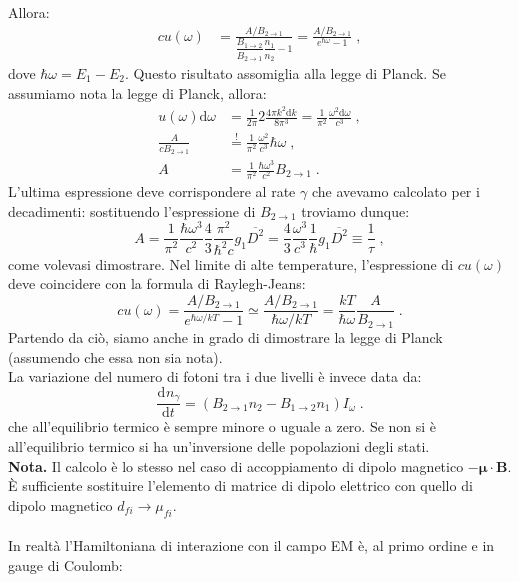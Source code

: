 \documentclass[12pt,a4paper]{report}
\theoremstyle{definition}
\newcommand{\dev}[3][]{\frac{\mathrm{d}^{#1} #2}{\mathrm{d} #3^{#1}}}
\numberwithin{equation}{section}
\newcommand{\diff}[1][]{\mathrm{d}#1}
\begin{document}
Allora:
\begin{align}
cu(\omega) &= \frac{A/B_{2\to 1}}{\dfrac{B_{1\to 2}}{B_{2\to 1}}\dfrac{n_1}{n_2}-1}=\frac{A/B_{2\to 1}}{e^{\hbar\omega}-1}\;,
\end{align}
dove $\hbar\omega= E_1-E_2$. Questo risultato assomiglia alla legge di Planck. Se assumiamo nota la legge di Planck, allora:
\begin{align*}
u(\omega)\diff{\omega}&=\frac{1}{2\pi}2\frac{4\pi k^2\diff{k}}{8\pi^3}=\frac{1}{\pi^2}\frac{\omega^2\diff{\omega}}{c^3}\;,  \\
\frac{A}{cB_{2\to 1}}&\stackrel{!}{=}\frac{1}{\pi^2}\frac{\omega^2}{c^3}\hbar\omega\;, \\
A&= \frac{1}{\pi^2}\frac{\hbar\omega^3}{c^2}B_{2\to 1}\;.
\end{align*}
L'ultima espressione deve corrispondere al rate $\gamma$ che avevamo calcolato per i decadimenti: sostituendo l'espressione di $B_{2\to 1}$  troviamo dunque:
\begin{equation}
A=\frac{1}{\pi^2}\frac{\hbar\omega^3}{c^2}\frac{4}{3}\frac{\pi^2}{\hbar^2c}g_1\overline{D^2}=\frac{4}{3}\frac{\omega^3}{c^3}\frac{1}{\hbar}g_1\overline{D^2}\equiv \frac{1}{\tau}\;,
\end{equation}
come volevasi dimostrare. Nel limite di alte temperature, l'espressione di $cu(\omega)$ deve coincidere con la formula di Raylegh-Jeans:
\begin{equation}
cu(\omega)=\frac{A/B_{2\to 1}}{e^{\hbar\omega/kT}-1}\simeq \frac{A/B_{2\to 1}}{\hbar\omega/kT}=\frac{kT}{\hbar\omega}\frac{A}{B_{2\to 1}}\;.
\end{equation}
Partendo da ciò, siamo anche in grado di dimostrare la legge di Planck (assumendo che essa non sia nota). \\
La variazione del numero di fotoni tra i due livelli è invece data da:
\begin{equation}
\dev{n_{\gamma}}{t}=(B_{2\to 1}n_2-B_{1\to 2}n_1)I_{\omega}\;.
\end{equation}
che all'equilibrio termico è sempre minore o uguale a zero. Se non si è all'equilibrio termico si ha un'inversione delle popolazioni degli stati. \\
\textbf{Nota.} Il calcolo è lo stesso nel caso di accoppiamento di dipolo magnetico $-\boldsymbol{\mu}\cdot\mathbf{B}$. È sufficiente sostituire l'elemento di matrice di dipolo elettrico con quello di dipolo magnetico $d_{fi}\to \mu_{fi}$. \\
\\
In realtà l'Hamiltoniana di interazione con il campo EM è, al primo ordine e in gauge di Coulomb:
\end{document}
